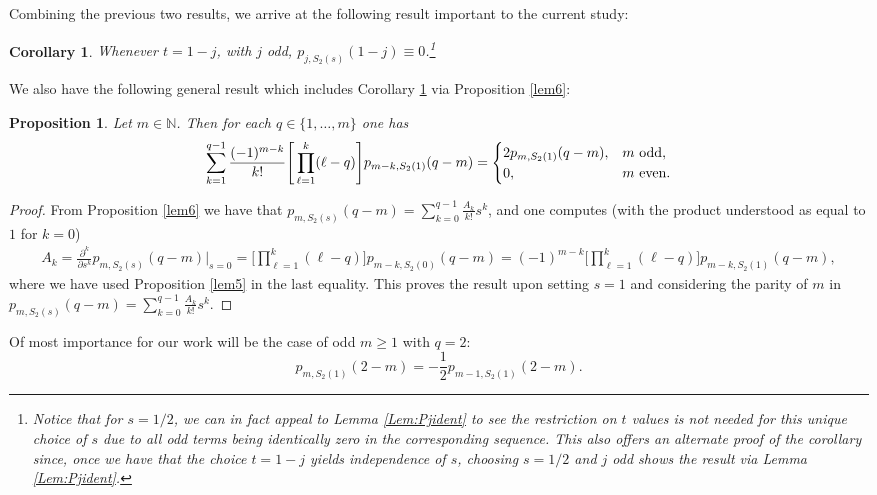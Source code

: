 \documentclass[letterpaper,10pt]{amsart}
\newtheorem{prop}[thm]{Proposition}
\newtheorem{corollary}[thm]{Corollary}
\numberwithin{equation}{section}
\begin{document}
Combining the previous two results, we arrive at the following result important to the current study:
\begin{corollary}\label{cor1}
Whenever $t=1-j$, with $j$ odd,  $p_{j,S_2(s)}(1-j)\equiv 0$.\footnote{Notice that for $s=1/2$, we can in fact appeal to Lemma \ref{Lem:Pjident} to see the restriction on $t$ values is not needed for this unique choice of $s$ due to all odd terms being identically zero in the corresponding sequence. This also offers an alternate proof of the corollary since, once we have that the choice $t=1-j$ yields independence of $s$, choosing $s=1/2$ and $j$ odd shows the result via Lemma \ref{Lem:Pjident}.}
\end{corollary}

We also have the following general result which includes Corollary \ref{cor1} via Proposition \ref{lem6}:
\begin{prop} \label{lem7}
    Let $m\in\mathbb{N}$. Then for each $q \in \{1,\dots,m\}$ one has
    \begin{align} \label{eq:36}
    \sum_{k=1}^{q-1} \frac{(-1)^{m-k}}{k!} \Bigg[\prod_{\ell=1}^k (\ell-q)\Bigg]p_{m-k,S_2(1)}(q-m) = \begin{cases}
        2p_{m,S_2(1)}(q-m), &m\textnormal{ odd}, \\ 0, & m \textnormal{ even}.
    \end{cases}
\end{align}
\end{prop}
\begin{proof}
    From Proposition \ref{lem6} we have that $p_{m,S_2(s)}(q-m) = \sum_{k=0}^{q-1}\tfrac{A_k}{k!}s^k$, and one computes (with the product understood as equal to $1$ for $k=0$)
\begin{align}
   A_k = \frac{\partial^k}{\partial s^k}p_{m,S_2(s)}(q-m)\Bigg|_{s=0} = \Bigg[\prod_{\ell=1}^k(\ell-q)\Bigg] p_{m-k,S_2(0)}(q-m)= (-1)^{m-k}\Bigg[\prod_{\ell=1}^k (\ell-q)\Bigg] p_{m-k,S_2(1)}(q-m),
\end{align}
where we have used Proposition \ref{lem5} in the last equality. This proves the result upon setting $s = 1$ and considering the parity of $m$ in $p_{m,S_2(s)}(q-m) = \sum_{k=0}^{q-1}\tfrac{A_k}{k!}s^k$.
\end{proof}

Of most importance for our work will be the case of odd $m\geq1$ with $q=2$:
\begin{equation}\label{Eq:75}
p_{m,S_2(1)}(2-m)=-\frac{1}{2} p_{m-1,S_2(1)}(2-m).
\end{equation}
\end{document}
